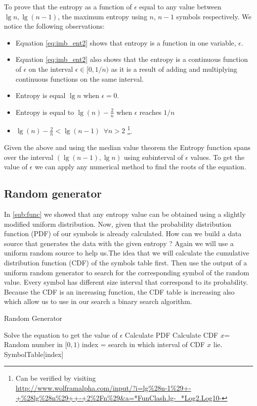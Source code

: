 To prove that the entropy as a function of $\epsilon$ equal to any value between $\lg n, \lg (n-1)$, the maximum entropy using $n$, $n-1$ symbols respectively. We notice the following observations:\\
\begin{itemize}
\item Equation \ref{eq:imb_ent2} shows that entropy is a function in one variable, $\epsilon$.
\item Equation \ref{eq:imb_ent2} also shows that the entropy is a continuous function of $\epsilon$ on the interval $\epsilon \in [0,1/n)$ as it is a result of adding and multiplying continuous functions on the same interval.
\item Entropy is equal $\lg n$ when $\epsilon = 0$.
\item Entropy is equal to $\lg(n) -\frac{2}{n}$  when $\epsilon$ reaches $1/n$
\item $\lg(n) - \frac{2}{n} < \lg(n-1) \,\,\, \forall n > 2$ \footnote{Can be verified by visiting\\ 
\url{http://www.wolframalpha.com/input/?i=lg\%28n-1\%29+-+\%28lg\%28n\%29++-+2\%2Fn\%29&a=*FunClash.lg-_*Log2.Log10-}}.
\end{itemize}
Given the above and using the median value theorem the Entropy function spans over the interval $(\lg (n-1), \lg n)$ using subinterval of $\epsilon$ values.
To get the value of $\epsilon$ we can apply any numerical method to find the roots of the equation.

\subsection{Random generator}
In \ref{sub:func} we showed that any entropy value can be obtained using a slightly modified uniform distribution.
Now, given that the probability distribution function (PDF) of our symbols is already calculated.
How can we build a data source that generates the data with the given entropy ?
Again we will use a uniform random source to help us.The idea that we will calculate the cumulative distribution
function (CDF) of the symbols table first. Then use the output of a uniform random generator to search for the
corresponding symbol of the random value. Every symbol has different size interval that correspond to its probability.
Because the CDF is an increasing function, the CDF table is increasing also which allow us to use in our search a binary
search algorithm. 
\begin{algorithm}
\caption{Random Generator}
\label{alg:rnd}
\begin{algorithmic}
\STATE Solve the equation to get the value of $\epsilon$
\STATE Calculate PDF
\STATE Calculate CDF
\STATE $x$= Random number in $[0,1)$
\STATE index = search in which interval of CDF $x$ lie.
\RETURN SymbolTable[index]
\ENDFOR
\end{algorithmic}
\end{algorithm}


